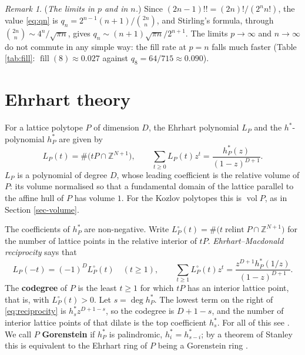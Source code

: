 \documentclass[11pt, a4paper, abstract=yes]{scrartcl}
\theoremstyle{definition}
\theoremstyle{remark}
\newtheorem{remark}[definition]{Remark}
\theoremstyle{plain}
\theoremstyle{remark}
\theoremstyle{plain}
\newcommand{\vol}{\operatorname{vol}}
\newcommand{\relint}{\operatorname{relint}}
\let\autocite\cite
\begin{document}
\begin{remark}
(\emph{The limits in \(p\) and in \(n\).}) Since \((2n-1)!!=(2n)!/(2^nn!)\), the value \eqref{eq:qn} is
\(q_n=2^{n-1}(n+1)/\binom{2n}n\), and Stirling's formula, through \(\binom{2n}n\sim4^n/\sqrt{\pi n}\),
gives \(q_n\sim(n+1)\sqrt{\pi n}/2^{n+1}\). The limits \(p\to\infty\) and \(n\to\infty\) do not
commute in any simple way: the fill rate at \(p=n\) falls much faster (Table \ref{tab:fill}: \(\operatorname{fill}(8)\approx0.027\) against
\(q_8=64/715\approx0.090\)).
\label{rem-kupreyeva-limit}
\end{remark}
\section{Ehrhart theory}
\label{sec-ehrhart}
For a lattice polytope \(P\) of dimension \(D\), the Ehrhart polynomial \(L_P\) and the
\(h^*\)-polynomial \(h^*_P\) are given by
\begin{equation}\label{eq:ehrhart}
  L_P(t)=\#\bigl(tP\cap\mathbb Z^{N+1}\bigr),\qquad
  \sum_{t\ge0}L_P(t)z^t=\frac{h^*_P(z)}{(1-z)^{D+1}} .
\end{equation}
\(L_P\) is a polynomial of degree \(D\), whose leading coefficient is the relative volume of \(P\):
its volume normalised so that a fundamental domain of the lattice parallel to the affine hull of
\(P\) has volume \(1\). For the Kozlov polytopes this is \(\vol P\), as in Section \ref{sec-volume}.

The coefficients of \(h^*_P\) are non-negative. Write
\(L^\circ_P(t)=\#\bigl(t\relint P\cap\mathbb Z^{N+1}\bigr)\) for the number of lattice points in the
relative interior of \(tP\). \emph{Ehrhart--Macdonald reciprocity} says that
\begin{equation}\label{eq:reciprocity}
  L_P(-t)=(-1)^DL^\circ_P(t)\quad(t\ge1),\qquad
  \sum_{t\ge1}L^\circ_P(t)z^t=\frac{z^{D+1}h^*_P(1/z)}{(1-z)^{D+1}} .
\end{equation}
The \textbf{codegree} of \(P\) is the least \(t\ge1\) for which \(tP\) has an interior lattice point,
that is, with \(L^\circ_P(t)>0\). Let \(s=\deg h^*_P\). The lowest term on the right of
\eqref{eq:reciprocity} is \(h^*_sz^{D+1-s}\), so the codegree is \(D+1-s\), and the number of
interior lattice points of that dilate is the top coefficient \(h^*_s\). For all of this see
\autocite[Chapters 3 and 4, in particular Theorems 4.1, 4.4 and 4.5]{BeckRobins2015}. We call \(P\)
\textbf{Gorenstein} if \(h^*_P\) is palindromic, \(h^*_i=h^*_{s-i}\); by a theorem of Stanley this is
equivalent to the Ehrhart ring of \(P\) being a Gorenstein ring \autocite{Stanley1996}.
\end{document}
